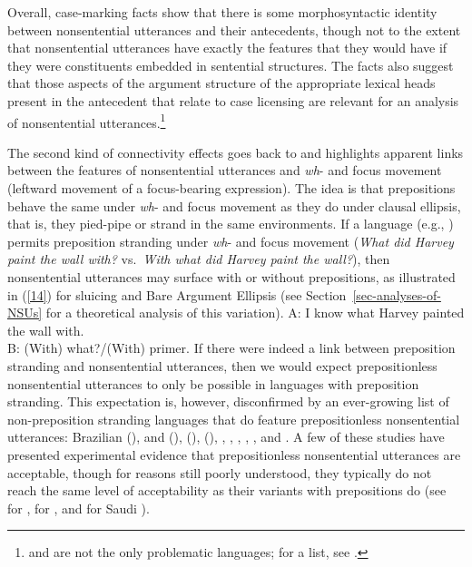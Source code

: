 Overall, case-marking facts show that there is some morphosyntactic identity between nonsentential utterances and their antecedents, though not to the extent that nonsentential utterances have exactly the features that they would have if they were constituents embedded in sentential structures. The  facts also suggest that those aspects of the argument structure of the appropriate lexical heads present in the antecedent that relate to case licensing are relevant for an analysis of nonsentential utterances.\footnote{ and  are not the only problematic languages; for a list, see \citet{Vicente2015}.}

The second kind of connectivity effects goes back to \citet{Merchant2001, Merchant2005a} and highlights apparent links between the features of nonsentential utterances and \emph{wh}- and focus movement (leftward movement of a focus-bearing expression). The idea is that prepositions behave the same under \emph{wh}- and focus movement as they do under clausal ellipsis, that is, they pied-pipe or strand in the same environments. If a language (e.g., ) permits preposition stranding under \emph{wh}- and focus movement (\emph{What did Harvey paint the wall with?} vs.\ \emph{With what did Harvey paint the wall?}), then nonsentential utterances may surface with or without prepositions, as illustrated in (\ref{14}) for sluicing and Bare Argument Ellipsis (see Section~\ref{sec-analyses-of-NSUs} for a theoretical analysis of this variation).
%
\ea A: I know what Harvey painted the wall with.\\B: (With) what?/(With) primer.\label{14}\z
%
If there were indeed a link between preposition stranding and nonsentential utterances, then we would expect prepositionless nonsentential utterances to only be possible in languages with preposition stranding. This expectation is, however, disconfirmed by an ever-growing list of non-preposition stranding languages that do feature prepositionless nonsentential utterances: Brazilian  (\citealt{AlmeidaYoshida2007}),  and  (\citealt{Rodrigues2006}),  (\citealt{Molimpakis2019a}),  (\citealt{Fortin2007}), %
  \citep{Philippova2014},  \citep{Szczegielniak2008, Sag2011, Nykiel2013}, %
 \citep{Abels2017},  \citep{Stjepanovic2008, Stjepanovic2012},  \citep{Abeille2019}, and %
 \citep{Leung2014, Alshaalan2020}. A few of these studies have presented experimental evidence that prepositionless nonsentential utterances are acceptable, though for reasons still poorly understood, they typically do not reach the same level of acceptability as their variants with prepositions do (see \citealt{Nykiel2013, Nykiel2021} for , \citealt{Molimpakis2019a} for , and \citealt{Alshaalan2020} for Saudi ). %
